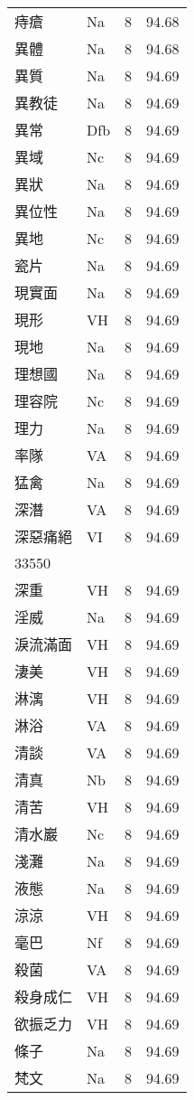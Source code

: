 \documentclass[twocolumn]{book}
\begin{document}
\begin{supertabular}{llrr}
痔瘡 & Na & 8 &  94.68\\
異體 & Na & 8 &  94.68\\
異質 & Na & 8 &  94.69\\
異教徒 & Na & 8 &  94.69\\
異常 & Dfb & 8 &  94.69\\
異域 & Nc & 8 &  94.69\\
異狀 & Na & 8 &  94.69\\
異位性 & Na & 8 &  94.69\\
異地 & Nc & 8 &  94.69\\
瓷片 & Na & 8 &  94.69\\
現實面 & Na & 8 &  94.69\\
現形 & VH & 8 &  94.69\\
現地 & Na & 8 &  94.69\\
理想國 & Na & 8 &  94.69\\
理容院 & Nc & 8 &  94.69\\
理力 & Na & 8 &  94.69\\
率隊 & VA & 8 &  94.69\\
猛禽 & Na & 8 &  94.69\\
深潛 & VA & 8 &  94.69\\
深惡痛絕 & VI & 8 &  94.69\\
33550\\
深重 & VH & 8 &  94.69\\
淫威 & Na & 8 &  94.69\\
淚流滿面 & VH & 8 &  94.69\\
淒美 & VH & 8 &  94.69\\
淋漓 & VH & 8 &  94.69\\
淋浴 & VA & 8 &  94.69\\
清談 & VA & 8 &  94.69\\
清真 & Nb & 8 &  94.69\\
清苦 & VH & 8 &  94.69\\
清水巖 & Nc & 8 &  94.69\\
淺灘 & Na & 8 &  94.69\\
液態 & Na & 8 &  94.69\\
涼涼 & VH & 8 &  94.69\\
毫巴 & Nf & 8 &  94.69\\
殺菌 & VA & 8 &  94.69\\
殺身成仁 & VH & 8 &  94.69\\
欲振乏力 & VH & 8 &  94.69\\
條子 & Na & 8 &  94.69\\
梵文 & Na & 8 &  94.69\\

\end{supertabular}
\end{document}
